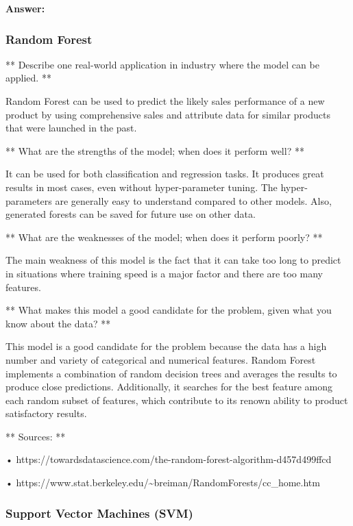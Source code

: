 \documentclass[11pt]{article}
\begin{document}
    \textbf{Answer: }

\hypertarget{random-forest}{%
\subsubsection{Random Forest}\label{random-forest}}

** Describe one real-world application in industry where the model can
be applied. **

Random Forest can be used to predict the likely sales performance of a
new product by using comprehensive sales and attribute data for similar
products that were launched in the past.

** What are the strengths of the model; when does it perform well? **

It can be used for both classification and regression tasks. It produces
great results in most cases, even without hyper-parameter tuning. The
hyper-parameters are generally easy to understand compared to other
models. Also, generated forests can be saved for future use on other
data.

** What are the weaknesses of the model; when does it perform poorly? **

The main weakness of this model is the fact that it can take too long to
predict in situations where training speed is a major factor and there
are too many features.

** What makes this model a good candidate for the problem, given what
you know about the data? **

This model is a good candidate for the problem because the data has a
high number and variety of categorical and numerical features. Random
Forest implements a combination of random decision trees and averages
the results to produce close predictions. Additionally, it searches for
the best feature among each random subset of features, which contribute
to its renown ability to product satisfactory results.

** Sources: **

•
https://towardsdatascience.com/the-random-forest-algorithm-d457d499ffcd

•
https://www.stat.berkeley.edu/\textasciitilde{}breiman/RandomForests/cc\_home.htm

\hypertarget{support-vector-machines-svm}{%
\subsubsection{Support Vector Machines
(SVM)}\label{support-vector-machines-svm}}
\end{document}
